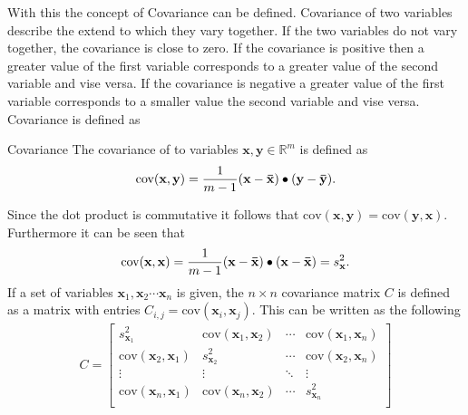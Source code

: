 With this the concept of Covariance can be defined.
Covariance of two variables describe the extend to which they vary together. If the two variables do not vary together, the covariance is close to zero. If the covariance is positive then a greater value of the first variable corresponds to a greater value of the second variable and vise versa. If the covariance is negative a greater value of the first variable corresponds to a smaller value the second variable and vise versa. Covariance is defined as 
\begin{definition}{Covariance}
    The covariance of to variables $\textbf{x}, \textbf{y}\in \mathbb{R}^m$ is defined as
    \begin{align*}
        \text{cov}(\textbf{x},\textbf{y})=\frac{1}{m-1}(\mathbf{x}-\mathbf{\Bar{x}}) \bullet (\mathbf{y}-\mathbf{\Bar{y}}).
    \end{align*}
\end{definition}
Since the dot product is commutative it follows that $\text{cov}(\textbf{x},\textbf{y})=\text{cov}(\textbf{y},\textbf{x})$. Furthermore it can be seen that
\begin{align*}
    \text{cov}(\textbf{x},\textbf{x})=\frac{1}{m-1}(\mathbf{x}-\mathbf{\Bar{x}}) \bullet (\mathbf{x}-\mathbf{\Bar{x}})=s^2_{\textbf{x}}.
\end{align*}
If a set of variables $\textbf{x}_1,\textbf{x}_2\cdots\textbf{x}_n$ is given, the $n\times n$ covariance matrix $C$ is defined as a matrix with entries $C_{i,j}=\text{cov}(\textbf{x}_i,\textbf{x}_j)$. This can be written as the following
\begin{align*}
    C=
    \begin{bmatrix}
        s_{\textbf{x}_1}^2 & \text{cov}(\textbf{x}_1,\textbf{x}_2) & \cdots & \text{cov}(\textbf{x}_1,\textbf{x}_n)\\
         \text{cov}(\textbf{x}_2,\textbf{x}_1)
         & s_{\textbf{x}_2}^2 &  \cdots &\text{cov}(\textbf{x}_2,\textbf{x}_n)\\
         \vdots & \vdots & \ddots & \vdots \\
          \text{cov}(\textbf{x}_n,\textbf{x}_1)  & \text{cov}(\textbf{x}_n,\textbf{x}_2) & \cdots & s_{\textbf{x}_n}^2\\
    \end{bmatrix}
\end{align*}
